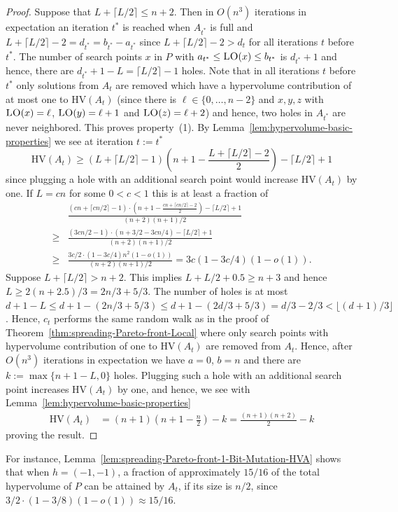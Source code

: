 \documentclass[
sigconf = false, %
review = false, %
screen = true, %
anonymous = true, %
format=acmsmall
]{acmart}
\newcommand{\hv}{\ensuremath{\mathrm{HV}}\xspace}
\newcommand{\LO}{\textsc{LO}\xspace}                      %
\begin{document}
\begin{proof}
Suppose that $L+\lceil{L/2}\rceil \leq n+2$. Then in $O(n^3)$ iterations in expectation an iteration $t^*$ is reached when $A_{t^*}$ is full and $L +\lceil{L/2}\rceil-2 = d_{t^*} = b_{t^*}-a_{t^*}$ since $L+\lceil{L/2}\rceil-2 > d_t$ for all iterations $t$ before $t^*$. The number of search points $x$ in $P$ with $a_{t^*} \leq \LO(x) \leq b_{t^*}$ is $d_{t^*}+1$ and hence, there are $d_{t^*}+1-L=\lceil{L/2}\rceil-1$ holes. Note that in all iterations $t$ before $t^*$ only solutions from $A_t$ are removed which have a hypervolume contribution of at most one to $\hv(A_t)$ (since there is $\ell \in \{0, \ldots , n-2\}$ and $x,y,z$ with $\LO(x)=\ell$, $\LO(y)=\ell+1$ and $\LO(z)=\ell+2$) and hence, two holes in $A_{t^*}$ are never neighbored. This proves property~(1). By Lemma~\ref{lem:hypervolume-basic-properties} we see at iteration $t:=t^*$ 
\[
\hv(A_t) \geq (L +\lceil{L/2}\rceil-1)\left(n+1-\frac{L +\lceil{L/2}\rceil-2}{2}\right) - \lceil{L/2}\rceil+1
\]
since plugging a hole with an additional search point would increase $\hv(A_t)$ by one. If $L=cn$ for some $0<c<1$ this is at least a fraction of
\begin{align*}
&\frac{(cn+\lceil{cn/2}\rceil-1) \cdot \left(n+1-\frac{cn+\lceil{cn/2}\rceil-2}{2}\right) -\lceil{L/2}\rceil+1}{{(n+2)(n+1)/2}}\\
\geq & \frac{(3cn/2-1) \cdot (n+3/2-3cn/4) -\lceil{L/2}\rceil+1}{{(n+2)(n+1)/2}}\\
\geq &\frac{3c/2 \cdot (1-3c/4)n^2(1-o(1))}{(n+2)(n+1)/2} = 3c(1-3c/4)(1 - o(1)).
\end{align*}
Suppose $L+\lceil{L/2}\rceil > n+2$. This implies $L + L/2 + 0.5 \geq n+3$ and hence $L \geq 2(n+2.5)/3=2n/3+5/3$. The number of holes is at most $d+1-L \leq d+1-(2n/3+5/3) \leq d+1-(2d/3+5/3) = d/3-2/3 < \lfloor{(d+1)/3}\rfloor$. Hence, $c_t$ performs the same random walk as in the proof of Theorem~\ref{thm:spreading-Pareto-front-Local} where only search points with hypervolume contribution of one to $\hv(A_t)$ are removed from $A_t$. Hence, after $O(n^3)$ iterations in expectation we have $a=0$, $b=n$ and there are $k:=\max\{n+1-L,0\}$ holes. Plugging such a hole with an additional search point increases $\hv(A_t)$ by one, and hence, we see with Lemma~\ref{lem:hypervolume-basic-properties}
\begin{align*}
\hv(A_t) &= (n+1)\left(n+1-\frac{n}{2}\right) - k = \frac{(n+1)(n+2)}{2}-k
\end{align*}
proving the result.  
\end{proof}

For instance, Lemma~\ref{lem:spreading-Pareto-front-1-Bit-Mutation-HVA} shows that when $h=(-1,-1)$, a fraction of approximately $15/16$ of the total hypervolume of $P$ can be attained by $A_t$, if its size is $n/2$, since $3/2 \cdot (1-3/8)(1-o(1)) \approx 15/16$.
\end{document}
